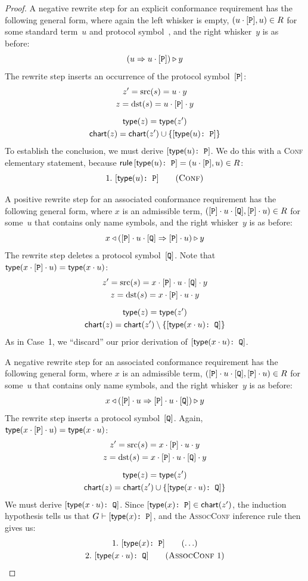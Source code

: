 \documentclass[../generics]{subfiles}
\begin{document}
\begin{proof}
 A negative rewrite step for an explicit conformance requirement has the following general form, where again the left whisker is empty, $(u\cdot[\texttt{P}],u)\in R$ for some standard term~$u$ and protocol symbol~\pP, and the right whisker~$y$ is as before:
\[(u\Rightarrow u\cdot[\texttt{P}])\triangleright y\]
The rewrite step inserts an occurrence of the protocol symbol~$[\texttt{P}]$:
\begin{gather*}
z'=\operatorname{src}(s)=u\cdot y\\
z=\operatorname{dst}(s)=u\cdot[\texttt{P}]\cdot y\\[\medskipamount]
\mathsf{type}(z)=\mathsf{type}(z')\\
\mathsf{chart}(z)=\mathsf{chart}(z') \cup \{[\texttt{$\mathsf{type}(u)$:~P}]\}
\end{gather*}
To establish the conclusion, we must derive $[\texttt{$\mathsf{type}(u)$:~P}]$. We do this with a \textsc{Conf} elementary statement, because $\mathsf{rule}\,[\texttt{$\mathsf{type}(u)$:~P}]=(u\cdot[\texttt{P}],u)\in R$:
\[
\ConfStep{$\Type(u)$}{P}{1}
\]

 A positive rewrite step for an associated conformance requirement has the following general form, where $x$ is an admissible term, $([\texttt{P}]\cdot u\cdot[\texttt{Q}],[\texttt{P}]\cdot u)\in R$ for some~$u$ that contains only name symbols, and the right whisker~$y$ is as before:
\[x\triangleleft([\texttt{P}]\cdot u\cdot[\texttt{Q}]\Rightarrow[\texttt{P}]\cdot u)\triangleright y\]
The rewrite step deletes a protocol symbol~$[\texttt{Q}]$. Note that $\mathsf{type}(x\cdot [\texttt{P}] \cdot u)=\mathsf{type}(x\cdot u)$:
\begin{gather*}
z'=\operatorname{src}(s)=x\cdot[\texttt{P}]\cdot u\cdot[\texttt{Q}]\cdot y\\
z=\operatorname{dst}(s)=x\cdot[\texttt{P}]\cdot u\cdot y\\[\medskipamount]
\mathsf{type}(z)=\mathsf{type}(z')\\
\mathsf{chart}(z)=\mathsf{chart}(z') \setminus \{[\texttt{$\mathsf{type}(x\cdot u)$:~Q}]\}
\end{gather*}
As in Case~1, we ``discard'' our prior derivation of $[\texttt{$\mathsf{type}(x\cdot u)$:~Q}]$.

 A negative rewrite step for an associated conformance requirement has the following general form, where $x$ is an admissible term, $([\texttt{P}]\cdot u\cdot [\texttt{Q}],[\texttt{P}]\cdot u)\in R$ for some~$u$ that contains only name symbols, and the right whisker~$y$ is as before:
\[x\triangleleft ([\texttt{P}]\cdot u\Rightarrow[\texttt{P}]\cdot u\cdot[\texttt{Q}])\triangleright y\]
The rewrite step inserts a protocol symbol~$[\texttt{Q}]$. Again, $\mathsf{type}(x\cdot [\texttt{P}] \cdot u)=\mathsf{type}(x\cdot u)$:
\begin{gather*}
z'=\operatorname{src}(s)=x\cdot[\texttt{P}]\cdot u\cdot y\\
z=\operatorname{dst}(s)=x\cdot[\texttt{P}]\cdot u\cdot[\texttt{Q}]\cdot y\\[\medskipamount]
\mathsf{type}(z)=\mathsf{type}(z')\\
\mathsf{chart}(z)=\mathsf{chart}(z') \cup \{[\texttt{$\mathsf{type}(x\cdot u)$:~Q}]\}
\end{gather*}
We must derive $[\texttt{$\mathsf{type}(x\cdot u)$:~Q}]$. Since $[\texttt{$\mathsf{type}(x)$:~P}]\in\mathsf{chart}(z')$, the induction hypothesis tells us that $G\vdash[\texttt{$\mathsf{type}(x)$:~P}]$, and the \textsc{AssocConf} inference rule then gives us:
\begin{gather*}
\AnyStep{\ConfReq{$\Type(x)$}{P}}{1}\\
\AssocConfStep{1}{$\Type(x\cdot u)$}{Q}{2}
\end{gather*}


\end{proof}
\end{document}
